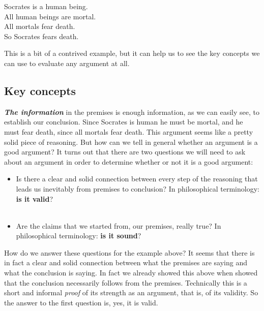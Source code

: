 \documentclass[12pt, openany]{book}
\makeatletter
\providecommand{\tightlist}{%
  \setlength{\itemsep}{0pt}\setlength{\parskip}{0pt}}
\newenvironment{kframe}{%
\medskip{}
\setlength{\fboxsep}{.8em}
 \def\at@end@of@kframe{}%
 \ifinner\ifhmode%
  \def\at@end@of@kframe{\end{minipage}}%
  \begin{minipage}{\columnwidth}%
 \fi\fi%
 \def\FrameCommand##1{\hskip\@totalleftmargin \hskip-\fboxsep
 \colorbox{shadecolor}{##1}\hskip-\fboxsep
     \hskip-\linewidth \hskip-\@totalleftmargin \hskip\columnwidth}%
 \MakeFramed {\advance\hsize-\width
   \@totalleftmargin\z@ \linewidth\hsize
   \@setminipage}}%
 {\par\unskip\endMakeFramed%
 \at@end@of@kframe}
\newenvironment{rmdblock}[1]
  {
  \begin{itemize}
  \renewcommand{\labelitemi}{
    \raisebox{-.7\height}[0pt][0pt]{
      {\setkeys{Gin}{width=3em,keepaspectratio}\texttt{[image: img/\#1]}}
    }
  }
  \setlength{\fboxsep}{1em}
  \begin{kframe}
  \item
  }
  {
  \end{kframe}
  \end{itemize}
  }
\newenvironment{note}
  {\begin{rmdblock}{note}}
  {\end{rmdblock}}
\makeatother
\begin{document}
\begin{center}

\begin{argument}

Socrates is a human being.\\
All human beings are mortal.\\
All mortals fear death.\\

So Socrates fears death.

\end{argument}

\end{center}

This is a bit of a contrived example, but it can help us to see the key concepts we can use to evaluate any argument at all.

\hypertarget{key-concepts}{%
\subsection*{Key concepts}\label{key-concepts}}


\textbf{\emph{The information}} in the premises is enough information, as we can easily see, to establish our conclusion. Since Socrates is human he must be mortal, and he must fear death, since all mortals fear death. This argument seems like a pretty solid piece of reasoning. But how can we tell in general whether an argument is a good argument? It turns out that there are two questions we will need to ask about an argument in order to determine whether or not it is a good argument:

\begin{note}

\begin{itemize}
\tightlist
\item
  Is there a clear and solid connection between every step of the reasoning that leads us inevitably from premises to conclusion? In philosophical terminology: \textbf{is it valid}?\\
  ~\\
\item
  Are the claims that we started from, our premises, really true? In philosophical terminology: \textbf{is it sound}?
\end{itemize}

\end{note}

How do we answer these questions for the example above? It seems that there is in fact a clear and solid connection between what the premises are saying and what the conclusion is saying. In fact we already showed this above when showed that the conclusion necessarily follows from the premises. Technically this is a short and informal \emph{proof} of its strength as an argument, that is, of its validity. So the answer to the first question is, yes, it is valid.
\end{document}
